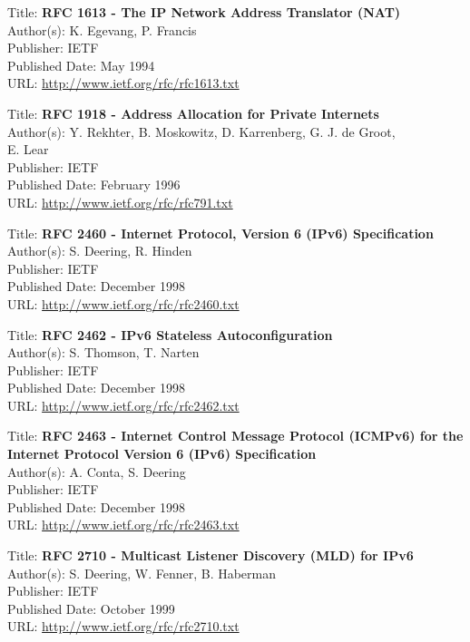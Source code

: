Title: \textbf{RFC 1613 - The IP Network Address Translator (NAT)} \\
Author(s): K. Egevang, P. Francis \\
Publisher: IETF \\ 
Published Date: May 1994  \\
URL: \url{http://www.ietf.org/rfc/rfc1613.txt}   


Title: \textbf{RFC 1918 - Address Allocation for Private Internets} \\
Author(s): Y. Rekhter, B. Moskowitz, D. Karrenberg, G. J. de Groot, \\
\hspace{15mm} E. Lear \\ 
Publisher: IETF \\ 
Published Date: February 1996  \\
URL: \url{http://www.ietf.org/rfc/rfc791.txt}    


Title: \textbf{RFC 2460 - Internet Protocol, Version 6 (IPv6) Specification} \\
Author(s): S. Deering, R. Hinden \\
Publisher: IETF \\ 
Published Date: December 1998 \\ 
URL: \url{http://www.ietf.org/rfc/rfc2460.txt}   


Title: \textbf{RFC 2462 - IPv6 Stateless Autoconfiguration} \\
Author(s): S. Thomson, T. Narten \\
Publisher: IETF \\ 
Published Date: December 1998\\
URL: \url{http://www.ietf.org/rfc/rfc2462.txt}   


Title: \textbf{RFC 2463 - Internet Control Message Protocol (ICMPv6) for the} \\
\hspace{15mm} \textbf{Internet Protocol Version 6 (IPv6) Specification} \\
Author(s): A. Conta, S. Deering \\
Publisher: IETF \\ 
Published Date: December 1998 \\ 
URL: \url{http://www.ietf.org/rfc/rfc2463.txt}   


Title: \textbf{RFC 2710 - Multicast Listener Discovery (MLD) for IPv6} \\ 
Author(s): S. Deering, W. Fenner, B. Haberman \\
Publisher: IETF \\ 
Published Date: October 1999 \\ 
URL: \url{http://www.ietf.org/rfc/rfc2710.txt}   
